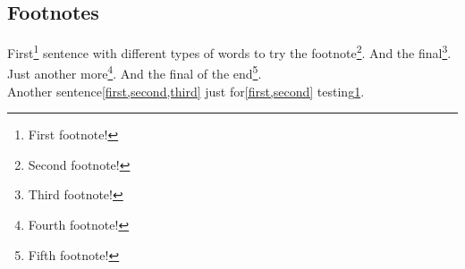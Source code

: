 \documentclass[../main.tex]{subfiles}
\begin{document}
\subsection{Footnotes}

First\footnote{\label{first}First footnote!} sentence with different types of words to try the footnote\footnote{\label{second}Second footnote!}. And the final\footnote{\label{third}Third footnote!}. Just another more\footnote{\label{fourth}Fourth footnote!}. And the final of the end\footnote{\label{fifth}Fifth footnote!}. \\
Another sentence\cref{first,second,third} just for\cref{first,second} testing\cref{first}.
\end{document}
